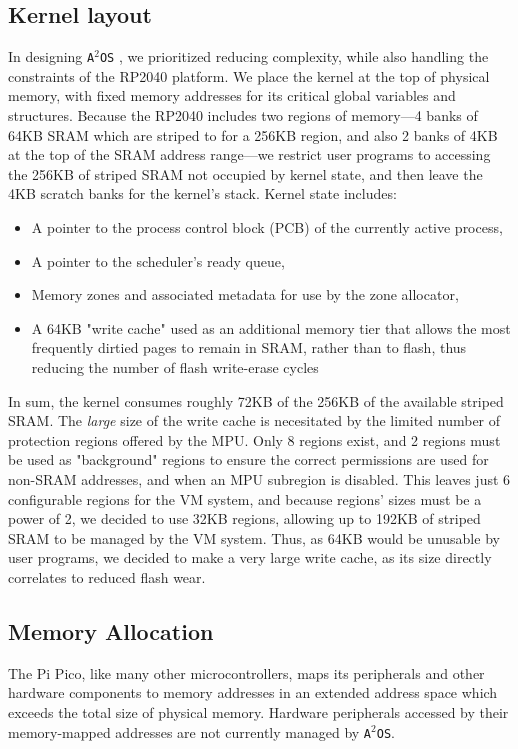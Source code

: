 \documentclass[12pt]{article}
\newcommand{\os}{\texttt{A$^2$OS} }
\newcommand{\osns}{\texttt{A$^2$OS}}
\begin{document}
\subsection{Kernel layout}
In designing \os, we prioritized reducing complexity, while also handling the
constraints of the RP2040 platform. We place the kernel at the top of physical
memory, with fixed memory addresses for its critical global variables and
structures. Because the RP2040 includes two regions of memory---4 banks of 64KB
SRAM which are striped to for a 256KB region, and also 2 banks of 4KB at the
top of the SRAM address range---we restrict user programs to accessing the 256KB
of striped SRAM not occupied by kernel state, and then leave the 4KB scratch
banks for the kernel's stack. Kernel state includes:
\begin{itemize}
    \item {A pointer to the process control block (PCB) of the currently active
    process,}
    \item A pointer to the scheduler's ready queue,
    \item Memory zones and associated metadata for use by the zone allocator,
    \item {A 64KB "write cache" used as an additional memory tier that allows
    the most frequently dirtied pages to remain in SRAM, rather than to flash,
    thus reducing the number of flash write-erase cycles}
\end{itemize}
In sum, the kernel consumes roughly 72KB of the 256KB of the available striped
SRAM. The \emph{large} size of the write cache is necesitated by the limited
number of protection regions offered by the MPU. Only 8 regions exist, and 2
regions must be used as "background" regions to ensure the correct permissions
are used for non-SRAM addresses, and when an MPU subregion is disabled. This
leaves just 6 configurable regions for the VM system, and because regions' sizes
must be a power of 2, we decided to use 32KB regions, allowing up to 192KB of
striped SRAM to be managed by the VM system. Thus, as 64KB would be unusable by
user programs, we decided to make a very large write cache, as its size directly
correlates to reduced flash wear.

\subsection{Memory Allocation}
The Pi Pico, like many other microcontrollers, maps its peripherals and other
hardware components to memory addresses in an extended address space which
exceeds the total size of physical memory. Hardware peripherals accessed by
their memory-mapped addresses are not currently managed by \osns.
\end{document}
